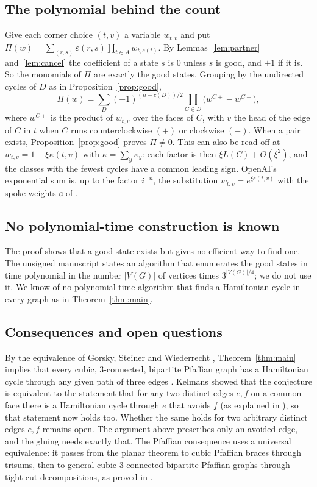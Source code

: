 \documentclass[10pt]{amsart}
\numberwithin{equation}{section}
\theoremstyle{definition}
\theoremstyle{remark}
\newcommand{\eps}{\varepsilon}
\begin{document}
\subsection*{The polynomial behind the count}
Give each corner choice $(t,v)$ a variable $w_{t,v}$ and put $\Pi(w)=\sum_{(r,s)}\eps(r,s)\prod_{t\in A}w_{t,s(t)}$.
By Lemmas~\ref{lem:partner} and~\ref{lem:cancel} the coefficient of a state $s$ is $0$ unless $s$ is good, and $\pm1$ if it is. So the monomials of $\Pi$ are exactly the good states.
Grouping by the undirected cycles of $D$ as in Proposition~\ref{prop:good},
\[
\Pi(w)=\sum_{D}(-1)^{(n-c(D))/2}\prod_{C\in D}\bigl(w^{C+}-w^{C-}\bigr),
\]
where $w^{C\pm}$ is the product of $w_{t,v}$ over the faces of $C$, with $v$ the head of the edge of $C$ in $t$ when $C$ runs counterclockwise $(+)$ or clockwise $(-)$.
When a pair exists, Proposition~\ref{prop:good} proves $\Pi\neq0$.
This can also be read off at $w_{t,v}=1+\xi\kappa(t,v)$ with $\kappa=\sum_y\kappa_y$: each factor is then $\xi L(C)+O(\xi^2)$, and the classes with the fewest cycles have a common leading sign.
OpenAI's exponential sum is, up to the factor $i^{-n}$, the substitution $w_{t,v}=e^{\xi \mathfrak a(t,v)}$ with the spoke weights $\mathfrak a$ of \cite[Lemma~5.3]{OpenAI2026}.

\subsection*{No polynomial-time construction is known}
The proof shows that a good state exists but gives no efficient way to find one.
The unsigned manuscript \cite{Anonymous2026} states an algorithm that enumerates the good states in time polynomial in the number $|V(G)|$ of vertices times $3^{|V(G)|/4}$; we do not use it.
We know of no polynomial-time algorithm that finds a Hamiltonian cycle in every graph as in Theorem~\ref{thm:main}.

\subsection*{Consequences and open questions}
By the equivalence of Gorsky, Steiner and Wiederrecht \cite[Theorem~4.16]{Gorsky2023}, Theorem~\ref{thm:main} implies that every cubic, $3$-connected, bipartite Pfaffian graph has a Hamiltonian cycle through any given path of three edges \cite[Corollary~7.2]{OpenAI2026}.
Kelmans showed that the conjecture is equivalent to the statement that for any two distinct edges $e,f$ on a common face there is a Hamiltonian cycle through $e$ that avoids $f$ (as explained in \cite{Hertel2005,Alt2016}), so that statement now holds too.
Whether the same holds for two arbitrary distinct edges $e,f$ remains open.
The argument above prescribes only an avoided edge, and the gluing needs exactly that.
The Pfaffian consequence uses a universal equivalence: it passes from the planar theorem to cubic Pfaffian braces through trisums, then to general cubic $3$-connected bipartite Pfaffian graphs through tight-cut decompositions, as proved in \cite[Theorem~4.16]{Gorsky2023}.
\end{document}
